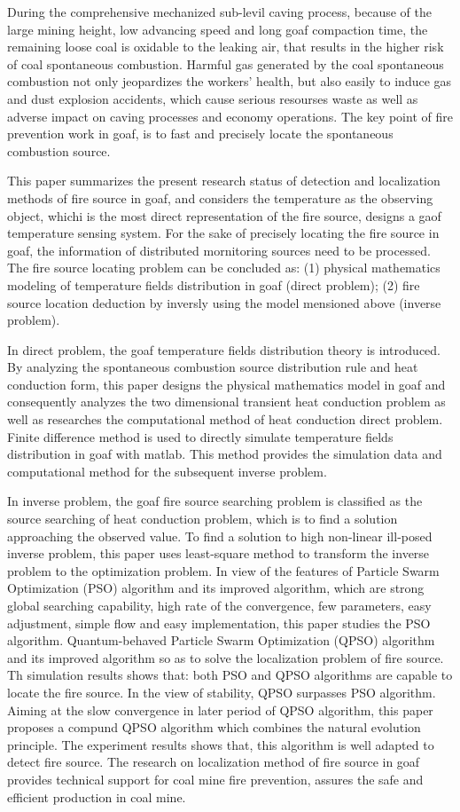During the comprehensive mechanized sub-levil caving process, because of the large mining height, low advancing speed and long goaf compaction time, the remaining loose coal is oxidable to the leaking air, that results in the higher risk of coal spontaneous combustion. Harmful gas generated by the coal spontaneous combustion not only jeopardizes the workers' health, but also easily to induce gas and dust explosion accidents, which cause serious resourses waste as well as adverse impact on caving processes and economy operations. The key point of fire prevention work in goaf, is to fast and precisely locate the spontaneous combustion source.

This paper summarizes the present research status of detection and localization methods of fire source in goaf, and considers the temperature as the observing object, whichi is the most direct representation of the fire source, designs a gaof temperature sensing system. For the sake of precisely locating the fire source in goaf, the information of distributed mornitoring sources need to be processed. The fire source locating problem can be concluded as: (1) physical mathematics modeling of temperature fields distribution in goaf (direct problem); (2) fire source location deduction by inversly using the model mensioned above (inverse problem).

In direct problem, the goaf temperature fields distribution theory is introduced. By analyzing the spontaneous combustion source distribution rule and heat conduction form, this paper designs the physical mathematics model in goaf and consequently analyzes the two dimensional transient heat conduction problem as well as researches the computational method of heat conduction direct problem. Finite difference method is used to directly simulate temperature fields distribution in goaf with matlab. This method provides the simulation data and computational method for the subsequent inverse problem.

In inverse problem, the goaf fire source searching problem is classified as the source searching of heat conduction problem, which is to find a solution approaching the observed value. To find a solution to high non-linear ill-posed inverse problem, this paper uses least-square method to transform the inverse problem to the optimization problem. In view of the features of Particle Swarm Optimization (PSO) algorithm and its improved algorithm, which are strong global searching capability, high rate of the convergence, few parameters, easy adjustment, simple flow and easy implementation, this paper studies the PSO algorithm. Quantum-behaved Particle Swarm Optimization (QPSO) algorithm and its improved algorithm so as to solve the localization problem of fire source. Th simulation results shows that: both PSO and QPSO algorithms are capable to locate the fire source. In the view of stability, QPSO surpasses PSO algorithm. Aiming at the slow convergence in later period of QPSO algorithm, this paper proposes a compund QPSO algorithm which combines the natural evolution principle. The experiment results shows that, this algorithm is well adapted to detect fire source. 
The research on localization method of fire source in goaf provides technical support for coal mine fire prevention, assures the safe and efficient production in coal mine.
